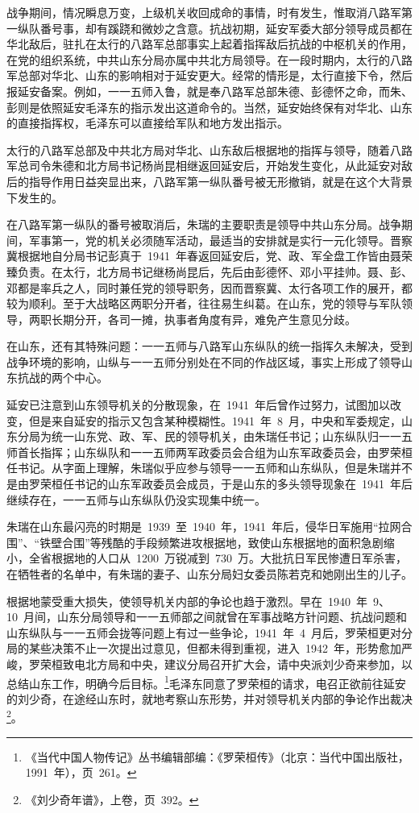 战争期间，情况瞬息万变，上级机关收回成命的事情，时有发生，惟取消八路军第一纵队番号事，却有蹊跷和微妙之含意。抗战初期，延安军委大部分领导成员都在华北敌后，驻扎在太行的八路军总部事实上起着指挥敌后抗战的中枢机关的作用，在党的组织系统，中共山东分局亦属中共北方局领导。在一段时期内，太行的八路军总部对华北、山东的影响相对于延安更大。经常的情形是，太行直接下令，然后报延安备案。例如，一一五师入鲁，就是奉八路军总部朱德、彭德怀之命，而朱、彭则是依照延安毛泽东的指示发出这道命令的。当然，延安始终保有对华北、山东的直接指挥权，毛泽东可以直接给军队和地方发出指示。

太行的八路军总部及中共北方局对华北、山东敌后根据地的指挥与领导，随着八路军总司令朱德和北方局书记杨尚昆相继返回延安后，开始发生变化，从此延安对敌后的指导作用日益突显出来，八路军第一纵队番号被无形撤销，就是在这个大背景下发生的。

在八路军第一纵队的番号被取消后，朱瑞的主要职责是领导中共山东分局。战争期间，军事第一，党的机关必须随军活动，最适当的安排就是实行一元化领导。晋察冀根据地自分局书记彭真于~1941~年春返回延安后，党、政、军全盘工作皆由聂荣臻负责。在太行，北方局书记继杨尚昆后，先后由彭德怀、邓小平挂帅。聂、彭、邓都是率兵之人，同时兼任党的领导职务，因而晋察冀、太行各项工作的展开，都较为顺利。至于大战略区两职分开者，往往易生纠葛。在山东，党的领导与军队领导，两职长期分开，各司一摊，执事者角度有异，难免产生意见分歧。

在山东，还有其特殊问题：一一五师与八路军山东纵队的统一指挥久未解决，受到战争环境的影响，山纵与一一五师分别处在不同的作战区域，事实上形成了领导山东抗战的两个中心。

延安已注意到山东领导机关的分散现象，在~1941~年后曾作过努力，试图加以改变，但是来自延安的指示又包含某种模糊性。1941~年~8~月，中央和军委规定，山东分局为统一山东党、政、军、民的领导机关，由朱瑞任书记；山东纵队归一一五师首长指挥；山东纵队和一一五师两军政委员会合组为山东军政委员会，由罗荣桓任书记。从字面上理解，朱瑞似乎应参与领导一一五师和山东纵队，但是朱瑞并不是由罗荣桓任书记的山东军政委员会成员，于是山东的多头领导现象在~1941~年后继续存在，一一五师与山东纵队仍没实现集中统一。

朱瑞在山东最闪亮的时期是~1939~至~1940~年，1941~年后，侵华日军施用“拉网合围”、“铁壁合围”等残酷的手段频繁进攻根据地，致使山东根据地的面积急剧缩小，全省根据地的人口从~1200~万锐减到~730~万。大批抗日军民惨遭日军杀害，在牺牲者的名单中，有朱瑞的妻子、山东分局妇女委员陈若克和她刚出生的儿子。

根据地蒙受重大损失，使领导机关内部的争论也趋于激烈。早在~1940~年~9、10~月间，山东分局领导和一一五师部之间就曾在军事战略方针问题、抗战问题和山东纵队与一一五师会拢等问题上有过一些争论，1941~年~4~月后，罗荣桓更对分局的某些决策不止一次提出过意见，但都未得到重视，进入~1942~年，形势愈加严峻，罗荣桓致电北方局和中央，建议分局召开扩大会，请中央派刘少奇来参加，以总结山东工作，明确今后目标。\footnote{《当代中国人物传记》丛书编辑部编：《罗荣桓传》（北京：当代中国出版社，1991~年），页~261。}毛泽东同意了罗荣桓的请求，电召正欲前往延安的刘少奇，在途经山东时，就地考察山东形势，并对领导机关内部的争论作出裁决\footnote{《刘少奇年谱》，上卷，页~392。}。

